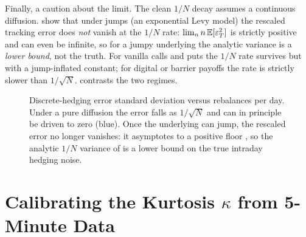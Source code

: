Finally, a caution about the limit. The clean $1/N$ decay assumes a continuous diffusion. \citet{BrodenTankov2010} show that under jumps (an exponential Levy model) the rescaled tracking error does \emph{not} vanish at the $1/N$ rate: $\lim_{n} n\,\mathbb{E}[\varepsilon_T^2]$ is strictly positive and can even be infinite, so for a jumpy underlying the analytic variance is a \emph{lower bound}, not the truth. For vanilla calls and puts the $1/N$ rate survives but with a jump-inflated constant; for digital or barrier payoffs the rate is strictly slower than $1/\sqrt{N}$.  contrasts the two regimes.

\begin{figure}[ht]
\centering
{}
\caption{Discrete-hedging error standard deviation versus rebalances per day. Under a pure diffusion the error falls as $1/\sqrt{N}$ and can in principle be driven to zero (blue). Once the underlying can jump, the rescaled error no longer vanishes: it asymptotes to a positive floor \citep[red,][]{BrodenTankov2010}, so the analytic $1/N$ variance of  is a lower bound on the true intraday hedging noise.}
\label{fig:ivrv:error-vs-n}
\end{figure}

\section{Calibrating the Kurtosis $\kappa$ from 5-Minute Data}
\label{sec:ivrv:kurtosis}

